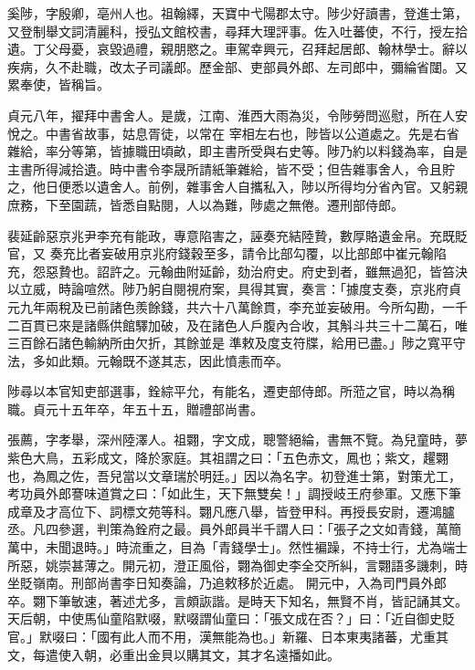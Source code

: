 \begin{pinyinscope}
 奚陟，字殷卿，亳州人也。祖翰繹，天寶中弋陽郡太守。陟少好讀書，登進士第，又登制舉文詞清麗科，授弘文館校書，尋拜大理評事。佐入吐蕃使，不行，授左拾遺。丁父母憂，哀毀過禮，親朋愍之。車駕幸興元，召拜起居郎、翰林學士。辭以疾病，久不赴職，改太子司議郎。歷金部、吏部員外郎、左司郎中，彌綸省闥。又累奉使，皆稱旨。



 貞元八年，擢拜中書舍人。是歲，江南、淮西大雨為災，令陟勞問巡慰，所在人安悅之。中書省故事，姑息胥徒，以常在
 宰相左右也，陟皆以公道處之。先是右省雜給，率分等第，皆據職田頃畝，即主書所受與右史等。陟乃約以料錢為率，自是主書所得減拾遺。時中書令李晟所請紙筆雜給，皆不受；但告雜事舍人，令且貯之，他日便悉以遺舍人。前例，雜事舍人自攜私入，陟以所得均分省內官。又躬親庶務，下至園蔬，皆悉自點閱，人以為難，陟處之無倦。遷刑部侍郎。



 裴延齡惡京兆尹李充有能政，專意陷害之，誣奏充結陸贄，數厚賂遺金帛。充既貶官，又
 奏充比者妄破用京兆府錢穀至多，請令比部勾覆，以比部郎中崔元翰陷充，怨惡贄也。詔許之。元翰曲附延齡，劾治府史。府史到者，雖無過犯，皆笞決以立威，時論喧然。陟乃躬自閱視府案，具得其實，奏言：「據度支奏，京兆府貞元九年兩稅及已前諸色羨餘錢，共六十八萬餘貫，李充並妄破用。今所勾勘，一千二百貫已來是諸縣供館驛加破，及在諸色人戶腹內合收，其斛斗共三十二萬石，唯三百餘石諸色輸納所由欠折，其餘並是
 準敕及度支符牒，給用已盡。」陟之寬平守法，多如此類。元翰既不遂其志，因此憤恚而卒。



 陟尋以本官知吏部選事，銓綜平允，有能名，遷吏部侍郎。所蒞之官，時以為稱職。貞元十五年卒，年五十五，贈禮部尚書。



 張薦，字孝舉，深州陸澤人。祖翾，字文成，聰警絕綸，書無不覽。為兒童時，夢紫色大鳥，五彩成文，降於家庭。其祖謂之曰：「五色赤文，鳳也；紫文，趯翾也，為鳳之佐，吾兒當以文章瑞於明廷。」因以為名字。初登進士第，對策尤工，
 考功員外郎謇味道賞之曰：「如此生，天下無雙矣！」調授岐王府參軍。又應下筆成章及才高位下、詞標文苑等科。翾凡應八舉，皆登甲科。再授長安尉，遷鴻臚丞。凡四參選，判策為銓府之最。員外郎員半千謂人曰：「張子之文如青錢，萬簡萬中，未聞退時。」時流重之，目為「青錢學士」。然性褊躁，不持士行，尤為端士所惡，姚崇甚薄之。開元初，澄正風俗，翾為御史李全交所糾，言翾語多譏刺，時坐貶嶺南。刑部尚書李日知奏論，乃追敕移於近處。
 開元中，入為司門員外郎卒。翾下筆敏速，著述尤多，言頗詼諧。是時天下知名，無賢不肖，皆記誦其文。天后朝，中使馬仙童陷默啜，默啜謂仙童曰：「張文成在否？」曰：「近自御史貶官。」默啜曰：「國有此人而不用，漢無能為也。」新羅、日本東夷諸蕃，尤重其文，每遣使入朝，必重出金貝以購其文，其才名遠播如此。




\end{pinyinscope}
